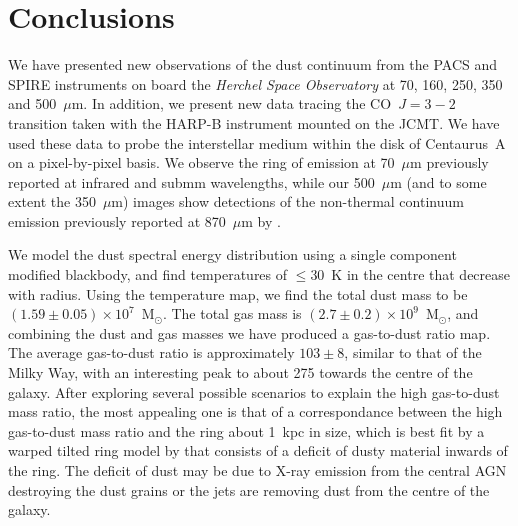 \documentclass[useAMS,usenatbib,usegraphicx]{mn2e}
\begin{document}
\section{Conclusions}\label{sec:conclusions}
We have presented new observations of the dust continuum from the PACS and SPIRE instruments on board the \emph{Herchel Space Observatory} at 70, 160, 250, 350 and 500~$\mu$m.  In addition, we present new data tracing the CO~$J=3-2$ transition taken with the HARP-B instrument mounted on the JCMT.  We have used these data to probe the interstellar medium within the disk of Centaurus~A on a pixel-by-pixel basis. We observe the ring of emission at 70~$\mu$m previously reported at infrared and submm wavelengths, while our 500~$\mu$m (and to some extent the 350~$\mu$m) images show detections of the non-thermal continuum emission previously reported at 870~$\mu$m by \citet{2008A&A...490...77W}.

We model the dust spectral energy distribution using a single component modified blackbody, and find temperatures of $\le 30$~K in the centre that decrease with radius.  Using the temperature map, we find the total dust mass to be $(1.59 \pm 0.05) \times 10^{7}$~M$_{\odot}$.  The total gas mass is $(2.7 \pm 0.2)\times 10^{9}$~M$_{\odot}$, and combining the dust and gas masses we have produced a gas-to-dust ratio map.  The average gas-to-dust ratio is approximately $103 \pm 8$, similar to that of the Milky Way, with an interesting peak to about 275 towards the centre of the galaxy.  After exploring several possible scenarios to explain the high gas-to-dust mass ratio, the most appealing one is that of a correspondance between the high gas-to-dust mass ratio and the ring about 1~kpc in size, which is best fit by a warped tilted ring model by \citet{2006ApJ...645.1092Q} that consists of a deficit of dusty material inwards of the ring.  The deficit of dust may be due to X-ray emission from the central AGN destroying the dust grains or the jets are removing dust from the centre of the galaxy.
\end{document}

